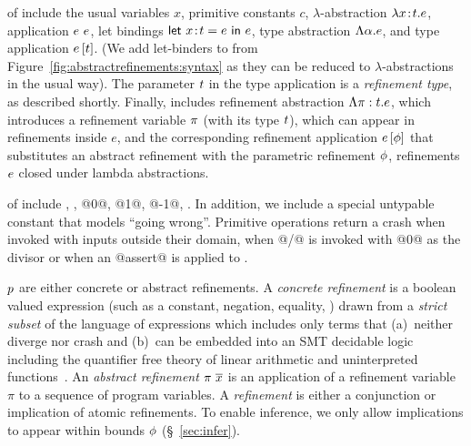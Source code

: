  of \corelan include the usual variables $x$,
primitive constants $c$, $\lambda$-abstraction $\lambda {x\!:\!t}. e$,
application ${e} \ {e}$,
let bindings $\mathsf{let} \ {x\!:\!t} = e \ \mathsf{in} \ e$,
type abstraction $\Lambda \alpha . e$,
and type application ${e} \left[ {t}\right]$.
(We add let-binders to \corelan
from Figure~\ref{fig:abstractrefinements:syntax} as they can be reduced to $\lambda$-abstractions
in the usual way).
%
The parameter $t$ in the type application is a \emph{refinement
type}, as described shortly.  Finally, \corelan includes refinement
abstraction $\Lambda {\pi:t} . e$, which introduces a refinement
variable $\pi$ (with its type $t$), which
can appear in refinements inside $e$, and the corresponding refinement
application ${e} \left[ \phi\right]$ that substitutes an abstract refinement
with the parametric refinement $\phi$, \ie
refinements $e$ closed under lambda abstractions.

 of \corelan include
\etrue, \efalse, @0@, @1@, @-1@, \etc. In addition, we include a
special untypable constant \ecrash that models ``going wrong''.
Primitive operations return a crash when invoked with inputs
outside their domain, \eg when @/@ is invoked with @0@ as the
divisor or when an @assert@ is applied to \efalse.

 $p$ are either concrete or abstract refinements.
%
A \emph{concrete refinement} \creft is a boolean valued expression
(such as a constant, negation, equality, \etc)
drawn from a \emph{strict subset} of the language of expressions
which includes only terms that
%
(a)~neither diverge nor crash and
%
(b)~can be embedded into an SMT decidable logic including
%
the quantifier free theory of linear arithmetic and uninterpreted
functions~\cite{LiquidICFP14}.
%
An \emph{abstract refinement} ${\pi \ \overline{x}}$ is an application of
a refinement variable $\pi$ to a sequence of program variables.
%
A \emph{refinement}  is either a conjunction or
implication of atomic refinements.
%
To enable inference, we only allow implications to appear within
bounds $\phi$ (\S~\ref{sec:infer}).


